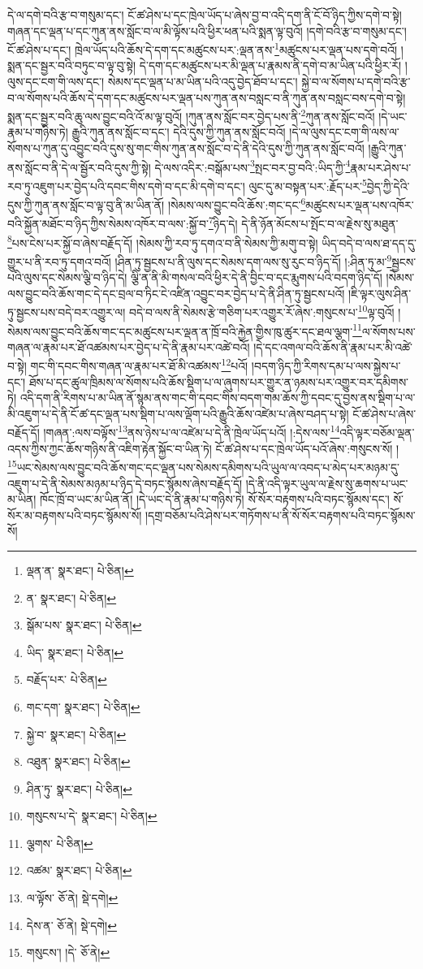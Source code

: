 དེ་ལ་དགེ་བའི་རྩ་བ་གསུམ་དང་། ངོ་ཚ་ཤེས་པ་དང་ཁྲེལ་ཡོད་པ་ཞེས་བྱ་བ་འདི་དག་ནི་ངོ་བོ་ཉིད་ཀྱིས་དགེ་བ་སྟེ། གཞན་དང་ལྡན་པ་དང་ཀུན་ནས་སློང་བ་ལ་མི་ལྟོས་པའི་ཕྱིར་ཕན་པའི་སྨན་ལྟ་བུའོ། །དགེ་བའི་རྩ་བ་གསུམ་དང་། ངོ་ཚ་ཤེས་པ་དང་། ཁྲེལ་ཡོད་པའི་ཆོས་དེ་དག་དང་མཚུངས་པར་:ལྡན་ནས་\footnote{ལྡན་ན་  སྣར་ཐང་།  པེ་ཅིན། }མཚུངས་པར་ལྡན་པས་དགེ་བའོ། །སྨན་དང་སྦྱར་བའི་བཏུང་བ་ལྟ་བུ་སྟེ། དེ་དག་དང་མཚུངས་པར་མི་ལྡན་པ་རྣམས་ནི་དགེ་བ་མ་ཡིན་པའི་ཕྱིར་རོ། །ལུས་དང་ངག་གི་ལས་དང་། སེམས་དང་ལྡན་པ་མ་ཡིན་པའི་འདུ་བྱེད་ཐོབ་པ་དང་། སྐྱེ་བ་ལ་སོགས་པ་དགེ་བའི་རྩ་བ་ལ་སོགས་པའི་ཆོས་དེ་དག་དང་མཚུངས་པར་ལྡན་པས་ཀུན་ནས་བསླང་བ་ནི་ཀུན་ནས་བསླང་བས་དགེ་བ་སྟེ། སྨན་དང་སྦྱར་བའི་ཆུ་ལས་བྱུང་བའི་འོ་མ་ལྟ་བུའོ། །ཀུན་ནས་སློང་བར་བྱེད་པས་ནི་\footnote{ན་  སྣར་ཐང་།  པེ་ཅིན། }ཀུན་ནས་སློང་བའོ། །དེ་ཡང་རྣམ་པ་གཉིས་ཏེ། རྒྱུའི་ཀུན་ནས་སློང་བ་དང་། དེའི་དུས་ཀྱི་ཀུན་ནས་སློང་བའོ། །དེ་ལ་ལུས་དང་ངག་གི་ལས་ལ་སོགས་པ་ཀུན་དུ་འབྱུང་བའི་དུས་སུ་གང་གིས་ཀུན་ནས་སློང་བ་དེ་ནི་དེའི་དུས་ཀྱི་ཀུན་ནས་སློང་བའོ། །རྒྱུའི་ཀུན་ནས་སློང་བ་ནི་དེ་ལ་སྦྱོར་བའི་དུས་ཀྱི་སྟེ། དེ་ལས་འདིར་:བསྒོམ་པས་\footnote{སྒོམ་པས་  སྣར་ཐང་།  པེ་ཅིན། }སྤང་བར་བྱ་བའི་:ཡིད་ཀྱི་\footnote{ཡིད་  སྣར་ཐང་།  པེ་ཅིན། }རྣམ་པར་ཤེས་པ་རབ་ཏུ་འཇུག་པར་བྱེད་པའི་དབང་གིས་དགེ་བ་དང་མི་དགེ་བ་དང་། ལུང་དུ་མ་བསྟན་པར་:རྗོད་པར་\footnote{བརྗོད་པར་  པེ་ཅིན། }བྱེད་ཀྱི་དེའི་དུས་ཀྱི་ཀུན་ནས་སློང་བ་ལྟ་བུ་ནི་མ་ཡིན་ནོ། །སེམས་ལས་བྱུང་བའི་ཆོས་:གང་དང་\footnote{གང་དག་  སྣར་ཐང་།  པེ་ཅིན། }མཚུངས་པར་ལྡན་པས་འཁོར་བའི་སྐྱོན་མཐོང་བ་ཉིད་ཀྱིས་སེམས་འཁོར་བ་ལས་:སྐྱོ་བ་\footnote{སྐྱེ་བ་  སྣར་ཐང་།  པེ་ཅིན། }ཉིད་དེ། དེ་ནི་ཉོན་མོངས་པ་སྤོང་བ་ལ་རྗེས་སུ་མཐུན་\footnote{འཐུན་  སྣར་ཐང་།  པེ་ཅིན། }པས་ངེས་པར་སྐྱོ་བ་ཞེས་བརྗོད་དོ། །སེམས་ཀྱི་རབ་ཏུ་དགའ་བ་ནི་སེམས་ཀྱི་མགུ་བ་སྟེ། ཡིད་བདེ་བ་ལས་ཐ་དད་དུ་གྱུར་པ་ནི་རབ་ཏུ་དགའ་བའོ། །ཤིན་ཏུ་སྦྱངས་པ་ནི་ལུས་དང་སེམས་དག་ལས་སུ་རུང་བ་ཉིད་དོ། །:ཤིན་ཏུ་མ་\footnote{ཤིན་ཏུ་  སྣར་ཐང་།  པེ་ཅིན། }སྦྱངས་པའི་ལུས་དང་སེམས་ལྕི་བ་ཉིད་དེ། ལྕི་ན་ནི་མི་གསལ་བའི་ཕྱིར་དེ་ནི་བྱིང་བ་དང་རྨུགས་པའི་བདག་ཉིད་དོ། །སེམས་ལས་བྱུང་བའི་ཆོས་གང་དེ་དང་བྲལ་བ་ཏིང་ངེ་འཛིན་འབྱུང་བར་བྱེད་པ་དེ་ནི་ཤིན་ཏུ་སྦྱངས་པའོ། །ཇི་ལྟར་ལུས་ཤིན་ཏུ་སྦྱངས་པས་བདེ་བར་འགྱུར་ལ། བདེ་བ་ལས་ནི་སེམས་རྩེ་གཅིག་པར་འགྱུར་རོ་ཞེས་:གསུངས་པ་\footnote{གསུངས་པ་དེ་  སྣར་ཐང་།  པེ་ཅིན། }ལྟ་བུའོ། །སེམས་ལས་བྱུང་བའི་ཆོས་གང་དང་མཚུངས་པར་ལྡན་ན་ཁྲོ་བའི་རྐྱེན་གྱིས་ཁུ་ཚུར་དང་ཐལ་ལྕག་\footnote{ལྕགས་  པེ་ཅིན། }ལ་སོགས་པས་གཞན་ལ་རྣམ་པར་ཐོ་འཚམས་པར་བྱེད་པ་དེ་ནི་རྣམ་པར་འཚེ་བའོ། །དེ་དང་འགལ་བའི་ཆོས་ནི་རྣམ་པར་མི་འཚེ་བ་སྟེ། གང་གི་དབང་གིས་གཞན་ལ་རྣམ་པར་ཐོ་མི་འཚམས་\footnote{འཚམ་  སྣར་ཐང་།  པེ་ཅིན། }པའོ། །བདག་ཉིད་ཀྱི་རིགས་དམ་པ་ལས་སྐྱེས་པ་དང་། ཐོས་པ་དང་ཚུལ་ཁྲིམས་ལ་སོགས་པའི་ཆོས་སྡིག་པ་ལ་ཞུགས་པར་གྱུར་ན་ཉམས་པར་འགྱུར་བར་དམིགས་ཏེ། འདི་དག་ནི་རིགས་པ་མ་ཡིན་ནོ་སྙམ་ནས་གང་གི་དབང་གིས་བདག་གམ་ཆོས་ཀྱི་དབང་དུ་བྱས་ནས་སྡིག་པ་ལ་མི་འཇུག་པ་དེ་ནི་ངོ་ཚ་དང་ལྡན་པས་སྡིག་པ་ལས་ལྡོག་པའི་རྒྱུའི་ཆོས་འཛེམ་པ་ཞེས་བཤད་པ་སྟེ། ངོ་ཚ་ཤེས་པ་ཞེས་བརྗོད་དོ། །གཞན་:ལས་བལྟོས་\footnote{ལ་ལྟོས་  ཅོ་ནེ།  སྡེ་དགེ། }ནས་ཉེས་པ་ལ་འཛེམ་པ་དེ་ནི་ཁྲེལ་ཡོད་པའོ། །:དེས་ལས་\footnote{དེས་ན་  ཅོ་ནེ།  སྡེ་དགེ། }འདི་ལྟར་བཅོམ་ལྡན་འདས་ཀྱིས་ཀྱང་ཆོས་གཉིས་ནི་འཇིག་རྟེན་སྐྱོང་བ་ཡིན་ཏེ། ངོ་ཚ་ཤེས་པ་དང་ཁྲེལ་ཡོད་པའོ་ཞེས་:གསུངས་སོ། །\footnote{གསུངས་། །དེ་  ཅོ་ནེ། }ཡང་སེམས་ལས་བྱུང་བའི་ཆོས་གང་དང་ལྡན་པས་སེམས་དམིགས་པའི་ཡུལ་ལ་འབད་པ་མེད་པར་མཉམ་དུ་འཇུག་པ་དེ་ནི་སེམས་མཉམ་པ་ཉིད་དེ་བཏང་སྙོམས་ཞེས་བརྗོད་དོ། །དེ་ནི་འདི་ལྟར་ཡུལ་ལ་རྗེས་སུ་ཆགས་པ་ཡང་མ་ཡིན། ཁོང་ཁྲོ་བ་ཡང་མ་ཡིན་ནོ། །དེ་ཡང་དེ་ནི་རྣམ་པ་གཉིས་ཏེ། སོ་སོར་བརྟགས་པའི་བཏང་སྙོམས་དང་། སོ་སོར་མ་བརྟགས་པའི་བཏང་སྙོམས་སོ། །དགྲ་བཅོམ་པའི་ཤེས་པར་གཏོགས་པ་ནི་སོ་སོར་བརྟགས་པའི་བཏང་སྙོམས་སོ། 